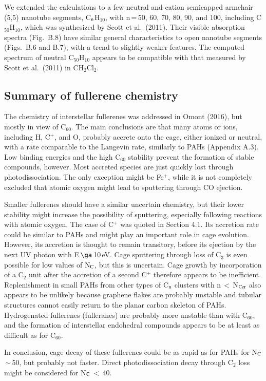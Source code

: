 \documentclass{aa}
\begin{document}
We extended the calculations to a few neutral and cation semicapped  armchair (5,5) nanotube segments, C$_{\rm n}$H$_{10}$, with n\,=\,50, 60, 70, 80, 90, and  100, including C$_{50}$H$_{10}$, which was synthesized by Scott et al.\ (2011). 
Their visible absorption spectra (Fig.\ B.8) have similar general characteristics to open nanotube segments (Figs.\ B.6 and B.7), with a trend to slightly weaker features. The computed spectrum of neutral C$_{50}$H$_{10}$  appears to be compatible with that measured by Scott et al.\ (2011) in CH$_2$Cl$_2$. 


\subsection{Summary of fullerene chemistry}
The chemistry of interstellar fullerenes was addressed in Omont (2016), but mostly in view of  C$_{60}$. The main conclusions are that many atoms or ions, including H, C$^+$, and O, probably accrete onto the cage, either ionized or neutral, with a rate comparable to the Langevin rate, similarly to PAHs (Appendix A.3). Low binding energies and the high C$_{60}$ stability prevent the formation of stable compounds, however. Most accreted species are just quickly lost through photodissociation. The only exception might be Fe$^+$, while it is not completely excluded that atomic oxygen 
might lead to sputtering through CO ejection. 

Smaller fullerenes should have a similar uncertain chemistry, but their lower stability  might increase the possibility of sputtering, especially following reactions with atomic oxygen. The case of C$^+$ was quoted in Section 4.1. Its accretion rate could be similar to PAHs and might play an important role in cage evolution. However, its accretion is thought to remain transitory, before its ejection by the next UV photon with E\,$\ga$\,10\,eV. Cage sputtering through loss of C$_3$ is even possible for 
low values of N$_{\rm C}$, but this is uncertain. Cage growth by incorporation of a C$_2$ unit after the accretion of a second C$^+$ therefore appears to be inefficient. Replenishment in small PAHs from other types of C$_{\rm n}$ clusters with n\,$<$\,N$_{\rm Ccr}$ also appears to be unlikely because graphene flakes are probably unstable and tubular structures cannot easily return to the planar carbon skeleton of PAHs.
Hydrogenated fullerenes (fulleranes) are probably more unstable than with C$_{60}$, and the formation of interstellar endohedral compounds appears to be at least as difficult as for C$_{60}$. 

In conclusion, cage decay of these fullerenes could be  as rapid as for PAHs for N$_{\rm C}$\,$\sim$\,50, but probably not faster. Direct photodissociation decay through C$_2$ loss might be considered for  N$_{\rm C}$\,$<$\,40.

\end{document}

